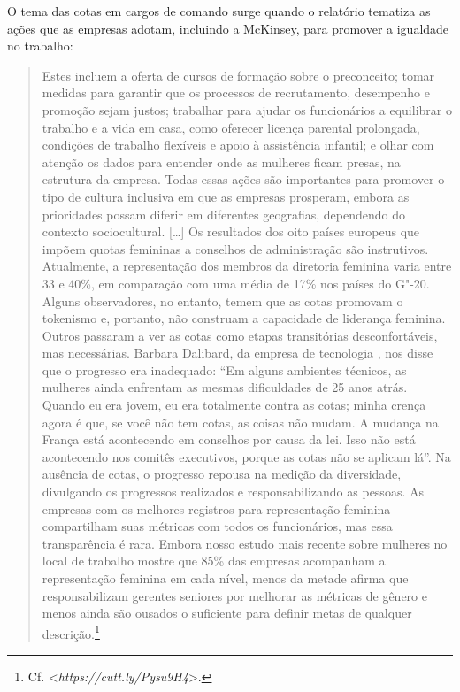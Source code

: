 O tema das cotas em cargos de comando surge quando o relatório tematiza
as ações que as empresas adotam, incluindo a McKinsey, para
promover a igualdade no trabalho:

\begin{quote}
Estes incluem a oferta de cursos de formação sobre o preconceito; tomar
medidas para garantir que os processos de recrutamento, desempenho e
promoção sejam justos; trabalhar para ajudar os funcionários a
equilibrar o trabalho e a vida em casa, como oferecer licença parental
prolongada, condições de trabalho flexíveis e apoio à assistência
infantil; e olhar com atenção os dados para entender onde as mulheres
ficam presas, na estrutura da empresa. Todas essas ações são importantes
para promover o tipo de cultura inclusiva em que as empresas prosperam,
embora as prioridades possam diferir em diferentes geografias,
dependendo do contexto sociocultural. {[}\ldots{}{]} Os resultados dos oito
países europeus que impõem quotas femininas a conselhos de administração
são instrutivos. Atualmente, a representação dos membros da diretoria
feminina varia entre 33 e 40\%, em comparação com uma média de 17\% nos
países do G"-20. Alguns observadores, no entanto, temem que as cotas
promovam o tokenismo e, portanto, não construam a capacidade de
liderança feminina. Outros passaram a ver as cotas como etapas
transitórias desconfortáveis, mas necessárias. Barbara Dalibard,  da
empresa de tecnologia , nos disse que o progresso era inadequado:
``Em alguns ambientes técnicos, as mulheres ainda enfrentam as mesmas
dificuldades de 25 anos atrás. Quando eu era jovem, eu era totalmente
contra as cotas; minha crença agora é que, se você não tem cotas, as
coisas não mudam. A mudança na França está acontecendo em conselhos por
causa da lei. Isso não está acontecendo nos comitês executivos, porque
as cotas não se aplicam lá''. Na ausência de cotas, o progresso repousa
na medição da diversidade, divulgando os progressos realizados e
responsabilizando as pessoas. As empresas com os melhores registros para
representação feminina compartilham suas métricas com todos os
funcionários, mas essa transparência é rara. Embora nosso estudo mais
recente sobre mulheres no local de trabalho mostre que 85\% das empresas
acompanham a representação feminina em cada nível, menos da metade
afirma que responsabilizam gerentes seniores por melhorar as métricas de
gênero e menos ainda são ousados ​​o suficiente para definir metas de
qualquer descrição.\footnote{Cf.
  \textless{}\emph{https://cutt.ly/Pysu9H4}\textgreater{}.}
\end{quote}

